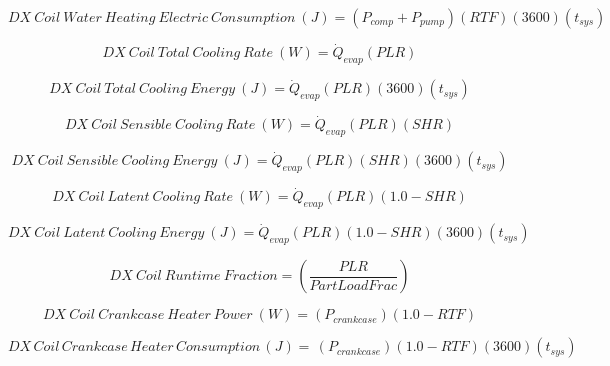 \begin{equation}
DX~Coil~Water~Heating~Electric~Consumption~(J) = \left( {{P_{comp}} + {P_{pump}}} \right)\left( {RTF} \right)\left( {3600} \right)\left( {{t_{sys}}} \right)
\end{equation}

\begin{equation}
DX~Coil~Total~Cooling~Rate~(W) = {\dot{Q}_{evap}}\left( {PLR} \right)
\end{equation}

\begin{equation}
DX~Coil~Total~Cooling~Energy~(J) = {\dot{Q}_{evap}}\left( {PLR} \right)\left( {3600} \right)\left( {{t_{sys}}} \right)
\end{equation}

\begin{equation}
DX~Coil~Sensible~Cooling~Rate~(W) = {\dot{Q}_{evap}}\left( {PLR} \right)\left( {SHR} \right)
\end{equation}

\begin{equation}
DX~Coil~Sensible~Cooling~Energy~(J) = {\dot{Q}_{evap}}\left( {PLR} \right)\left( {SHR} \right)\left( {3600} \right)\left( {{t_{sys}}} \right)
\end{equation}

\begin{equation}
DX~Coil~Latent~Cooling~Rate~(W) = {\dot{Q}_{evap}}\left( {PLR} \right)\left( {1.0 - SHR} \right)
\end{equation}

\begin{equation}
DX~Coil~Latent~Cooling~Energy~(J) = {\dot{Q}_{evap}}\left( {PLR} \right)\left( {1.0 - SHR} \right)\left( {3600} \right)\left( {{t_{sys}}} \right)
\end{equation}

\begin{equation}
DX~Coil~Runtime~Fraction = \left( \frac{PLR}{PartLoadFrac} \right)
\end{equation}

\begin{equation}
DX~Coil~Crankcase~Heater~Power~(W) = \left( {{P_{crankcase}}} \right)\left( {1.0 - RTF} \right)
\end{equation}

\begin{equation}
DX\,Coil\,Crankcase\,Heater\,Consumption\,(J) = \,\left( {{P_{crankcase}}} \right)\left( {1.0 - RTF} \right)\left( {3600} \right)\left( {{t_{sys}}} \right)
\end{equation}

